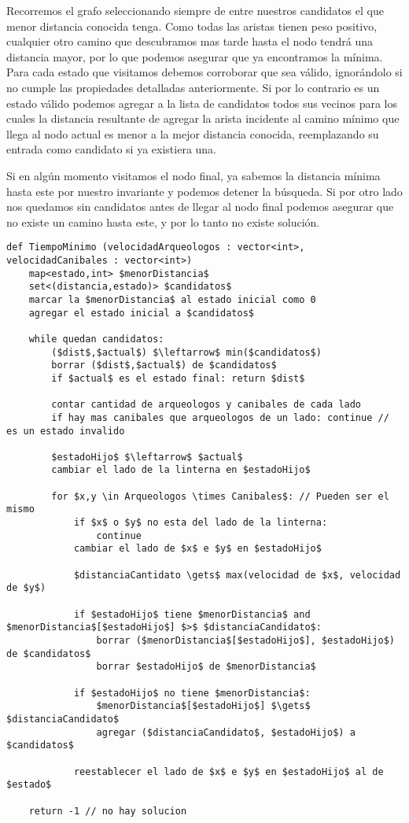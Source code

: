     Recorremos el grafo seleccionando siempre de entre nuestros candidatos el que menor distancia conocida tenga. Como todas las aristas tienen peso positivo, cualquier otro camino que descubramos mas tarde hasta el nodo tendrá una distancia mayor, por lo que podemos asegurar que ya encontramos la mínima. Para cada estado que visitamos debemos corroborar que sea válido, ignorándolo si no cumple las propiedades detalladas anteriormente. Si por lo contrario es un estado válido podemos agregar a la lista de candidatos todos sus vecinos para los cuales la distancia resultante de agregar la arista incidente al camino mínimo que llega al nodo actual es menor a la mejor distancia conocida, reemplazando su entrada como candidato si ya existiera una.

    Si en algún momento visitamos el nodo final, ya sabemos la distancia mínima hasta este por nuestro invariante y podemos detener la búsqueda. Si por otro lado nos quedamos sin candidatos antes de llegar al nodo final podemos asegurar que no existe un camino hasta este, y por lo tanto no existe solución.
\\

\begin{lstlisting}
def TiempoMinimo (velocidadArqueologos : vector<int>, velocidadCanibales : vector<int>)
    map<estado,int> $menorDistancia$
    set<(distancia,estado)> $candidatos$
    marcar la $menorDistancia$ al estado inicial como 0
    agregar el estado inicial a $candidatos$

    while quedan candidatos:
        ($dist$,$actual$) $\leftarrow$ min($candidatos$)
        borrar ($dist$,$actual$) de $candidatos$
        if $actual$ es el estado final: return $dist$

        contar cantidad de arqueologos y canibales de cada lado
        if hay mas canibales que arqueologos de un lado: continue // es un estado invalido

        $estadoHijo$ $\leftarrow$ $actual$
        cambiar el lado de la linterna en $estadoHijo$

        for $x,y \in Arqueologos \times Canibales$: // Pueden ser el mismo
            if $x$ o $y$ no esta del lado de la linterna:
                continue
            cambiar el lado de $x$ e $y$ en $estadoHijo$

            $distanciaCantidato \gets$ max(velocidad de $x$, velocidad de $y$)

            if $estadoHijo$ tiene $menorDistancia$ and $menorDistancia$[$estadoHijo$] $>$ $distanciaCandidato$:
                borrar ($menorDistancia$[$estadoHijo$], $estadoHijo$) de $candidatos$
                borrar $estadoHijo$ de $menorDistancia$

            if $estadoHijo$ no tiene $menorDistancia$:
                $menorDistancia$[$estadoHijo$] $\gets$ $distanciaCandidato$
                agregar ($distanciaCandidato$, $estadoHijo$) a $candidatos$

            reestablecer el lado de $x$ e $y$ en $estadoHijo$ al de $estado$

    return -1 // no hay solucion

\end{lstlisting}

